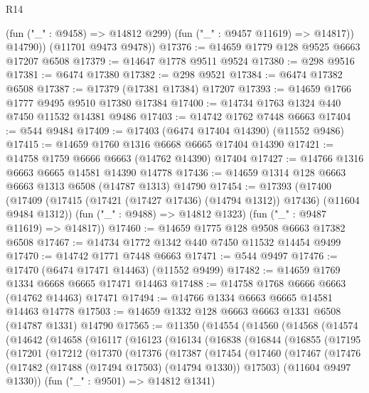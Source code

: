 \begin{lexlean}{R14}
\begin{coremodule}
            (fun ("_" : @9458) => @14812 @299)
            (fun ("_" : @9457 @11619) => @14817))
          @14790))
      (@11701 @9473 @9478))
@17376 := @14659 @1779 @128 @9525 @6663 @17207 @6508
@17379 := @14647 @1778 @9511 @9524
@17380 := @298 @9516
@17381 := @6474 @17380
@17382 := @298 @9521
@17384 := @6474 @17382 @6508
@17387 := @17379 (@17381 @17384) @17207
@17393 := @14659 @1766 @1777 @9495 @9510 @17380 @17384
@17400 := @14734 @1763 @1324 @440 @7450 @11532 @14381 @9486
@17403 := @14742 @1762 @7448 @6663
@17404 := @544 @9484
@17409 := @17403 (@6474 @17404 @14390) (@11552 @9486)
@17415 := @14659 @1760 @1316 @6668 @6665 @17404 @14390
@17421 := @14758 @1759 @6666 @6663 (@14762 @14390) @17404
@17427 := @14766 @1316 @6663 @6665 @14581 @14390 @14778
@17436 := @14659 @1314 @128 @6663 @6663 @1313 @6508 (@14787 @1313) @14790
@17454 := @17393
    (@17400
      (@17409 (@17415 (@17421 (@17427 @17436) (@14794 @1312)) @17436) (@11604 @9484 @1312))
      (fun ("_" : @9488) => @14812 @1323)
      (fun ("_" : @9487 @11619) => @14817))
@17460 := @14659 @1775 @128 @9508 @6663 @17382 @6508
@17467 := @14734 @1772 @1342 @440 @7450 @11532 @14454 @9499
@17470 := @14742 @1771 @7448 @6663
@17471 := @544 @9497
@17476 := @17470 (@6474 @17471 @14463) (@11552 @9499)
@17482 := @14659 @1769 @1334 @6668 @6665 @17471 @14463
@17488 := @14758 @1768 @6666 @6663 (@14762 @14463) @17471
@17494 := @14766 @1334 @6663 @6665 @14581 @14463 @14778
@17503 := @14659 @1332 @128 @6663 @6663 @1331 @6508 (@14787 @1331) @14790
@17565 := @11350
    (@14554
      (@14560
        (@14568
          (@14574
            (@14642
              (@14658
                (@16117
                  (@16123
                    (@16134
                      (@16838
                        (@16844
                          (@16855
                            (@17195
                              (@17201
                                (@17212
                                  (@17370
                                    (@17376
                                      (@17387
                                        (@17454
                                          (@17460
                                            (@17467
                                              (@17476
                                                (@17482
                                                  (@17488 (@17494 @17503) (@14794 @1330))
                                                  @17503)
                                                (@11604 @9497 @1330))
                                              (fun ("_" : @9501) => @14812 @1341)

\end{coremodule}
\end{lexlean}
